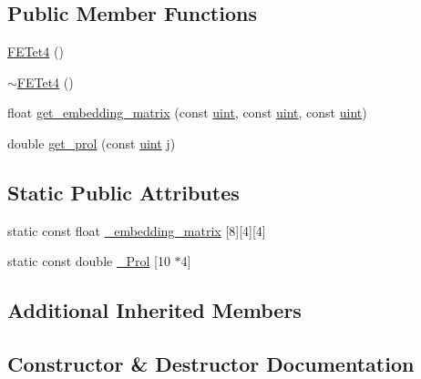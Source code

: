 \subsection*{Public Member Functions}
\begin{DoxyCompactItemize}
\item 
\mbox{\hyperlink{classfemus_1_1_f_e_tet4_a3db8e324f2f3f507da91a6615aeb3c8e}{F\+E\+Tet4}} ()
\item 
\mbox{\hyperlink{classfemus_1_1_f_e_tet4_a5e0ec354749e982f4f0e105133819260}{$\sim$\+F\+E\+Tet4}} ()
\item 
float \mbox{\hyperlink{classfemus_1_1_f_e_tet4_a36513f2c430b37b0dd47e4ad5827fd01}{get\+\_\+embedding\+\_\+matrix}} (const \mbox{\hyperlink{_typedefs_8hpp_a91ad9478d81a7aaf2593e8d9c3d06a14}{uint}}, const \mbox{\hyperlink{_typedefs_8hpp_a91ad9478d81a7aaf2593e8d9c3d06a14}{uint}}, const \mbox{\hyperlink{_typedefs_8hpp_a91ad9478d81a7aaf2593e8d9c3d06a14}{uint}})
\item 
double \mbox{\hyperlink{classfemus_1_1_f_e_tet4_a28b82560cde667962c16ad58ec0def9c}{get\+\_\+prol}} (const \mbox{\hyperlink{_typedefs_8hpp_a91ad9478d81a7aaf2593e8d9c3d06a14}{uint}} j)
\end{DoxyCompactItemize}
\subsection*{Static Public Attributes}
\begin{DoxyCompactItemize}
\item 
static const float \mbox{\hyperlink{classfemus_1_1_f_e_tet4_a23f530d1cb3b633f2180c9cfb7d9ee02}{\+\_\+embedding\+\_\+matrix}} \mbox{[}8\mbox{]}\mbox{[}4\mbox{]}\mbox{[}4\mbox{]}
\item 
static const double \mbox{\hyperlink{classfemus_1_1_f_e_tet4_a2b801b1bb62bc02149acd7cdbcc6a69c}{\+\_\+\+Prol}} \mbox{[}10 $\ast$4\mbox{]}
\end{DoxyCompactItemize}
\subsection*{Additional Inherited Members}


\subsection{Constructor \& Destructor Documentation}
\mbox{\label{classfemus_1_1_f_e_tet4_a3db8e324f2f3f507da91a6615aeb3c8e}} 

